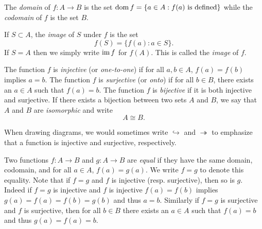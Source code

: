 The \emph{domain} of \(f : A \to B\) is the set \(\operatorname{dom} f = \{a \in A : f(a)
\text{ is defined}\}\) while the \emph{codomain} of \(f\) is the set \(B\). 

If \(S \subset A\), the \emph{image} of \(S\) under \(f\) is the set
\[
    f(S) = \{f(a) : a \in S\}.
\]
If \(S = A\) then we simply write \(\operatorname{im} f\) for \(f(A)\). This is called the
\emph{image} of \(f\).


The function \(f\) is \emph{injective} (or \emph{one-to-one}) if for all \(a, b
\in A\), \(f(a) = f(b)\) implies \(a = b\). The function \(f\) is
\emph{surjective} (or \emph{onto}) if for all \(b \in B\), there exists an \(a
\in A\) such that \(f(a) = b\). The function \(f\) is \emph{bijective} if it is
both injective and surjective. If there exists a bijection between two sets
\(A\) and \(B\), we say that \(A\) and \(B\) are \emph{isomorphic} and write
\[
    A \cong B.
\]

When drawing diagrams, we would sometimes write \(\hookrightarrow\) and
\(\twoheadrightarrow\) to emphasize that a function is injective and surjective,
respectively.

Two functions \(f: A \to B\) and \(g: A \to B\) are \emph{equal} if they have
the same domain, codomain, and for all \(a \in A\), \(f(a) = g(a)\). We write
\(f = g\) to denote this equality. Note that if \(f = g\) and \(f\) is injective
(resp. surjective), then so is \(g\). Indeed if \(f = g\) is injective and \(f\)
is injective \(f(a) = f(b)\) implies \(g(a) = f(a) = f(b) = g(b)\) and thus \(a
= b\). Similarly if \(f = g\) is surjective and \(f\) is surjective, then for
all \(b \in B\) there exists an \(a \in A\) such that \(f(a) = b\) and thus
\(g(a) = f(a) = b\).

